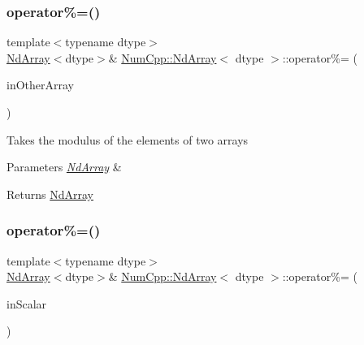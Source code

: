 \subsubsection{\texorpdfstring{operator\%=()}{operator\%=()}\hspace{0.1cm}{\footnotesize\ttfamily [1/2]}}
{\footnotesize\ttfamily template$<$typename dtype$>$ \\
\mbox{\hyperlink{class_num_cpp_1_1_nd_array}{Nd\+Array}}$<$dtype$>$\& \mbox{\hyperlink{class_num_cpp_1_1_nd_array}{Num\+Cpp\+::\+Nd\+Array}}$<$ dtype $>$\+::operator\%= (\begin{DoxyParamCaption}\item[{const \mbox{\hyperlink{class_num_cpp_1_1_nd_array}{Nd\+Array}}$<$ dtype $>$ \&}]{in\+Other\+Array }\end{DoxyParamCaption})\hspace{0.3cm}{\ttfamily [inline]}}

Takes the modulus of the elements of two arrays


\begin{DoxyParams}{Parameters}
{\em \mbox{\hyperlink{class_num_cpp_1_1_nd_array}{Nd\+Array}}} & \\
\hline
\end{DoxyParams}
\begin{DoxyReturn}{Returns}
\mbox{\hyperlink{class_num_cpp_1_1_nd_array}{Nd\+Array}} 
\end{DoxyReturn}
\mbox{\label{class_num_cpp_1_1_nd_array_adc5ba0569d53e76fdb11608c480ad43b}} 
\subsubsection{\texorpdfstring{operator\%=()}{operator\%=()}\hspace{0.1cm}{\footnotesize\ttfamily [2/2]}}
{\footnotesize\ttfamily template$<$typename dtype$>$ \\
\mbox{\hyperlink{class_num_cpp_1_1_nd_array}{Nd\+Array}}$<$dtype$>$\& \mbox{\hyperlink{class_num_cpp_1_1_nd_array}{Num\+Cpp\+::\+Nd\+Array}}$<$ dtype $>$\+::operator\%= (\begin{DoxyParamCaption}\item[{dtype}]{in\+Scalar }\end{DoxyParamCaption})\hspace{0.3cm}{\ttfamily [inline]}}

